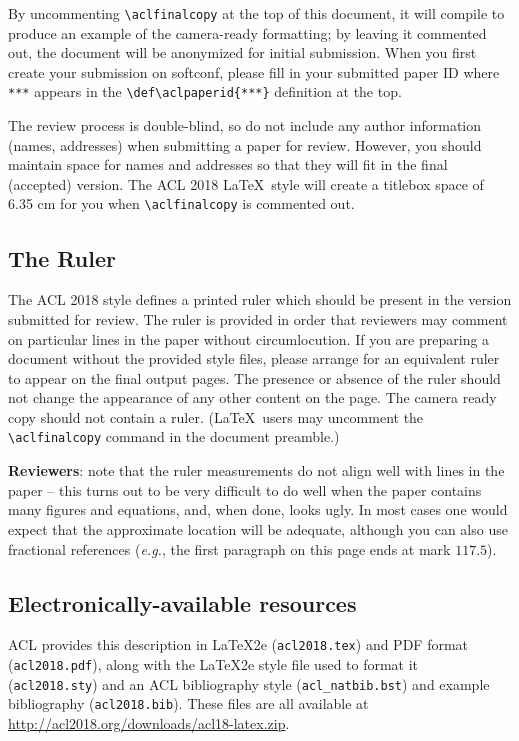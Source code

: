 \documentclass[11pt,a4paper]{article}
\begin{document}
By uncommenting {\verb|\aclfinalcopy|} at the top of this 
 document, it will compile to produce an example of the camera-ready formatting; by leaving it commented out, the document will be anonymized for initial submission.  When you first create your submission on softconf, please fill in your submitted paper ID where {\verb|***|} appears in the {\verb|\def\aclpaperid{***}|} definition at the top.

The review process is double-blind, so do not include any author information (names, addresses) when submitting a paper for review.  
However, you should maintain space for names and addresses so that they will fit in the final (accepted) version.  The ACL 2018 \LaTeX\ style will create a titlebox space of 6.35 cm for you when {\verb|\aclfinalcopy|} is commented out.  

\subsection{The Ruler}
The ACL 2018 style defines a printed ruler which should be present in the
version submitted for review.  The ruler is provided in order that
reviewers may comment on particular lines in the paper without
circumlocution.  If you are preparing a document without the provided
style files, please arrange for an equivalent ruler to
appear on the final output pages.  The presence or absence of the ruler
should not change the appearance of any other content on the page.  The
camera ready copy should not contain a ruler. (\LaTeX\ users may uncomment the {\verb|\aclfinalcopy|} command in the document preamble.)  

\textbf{Reviewers}: note that the ruler measurements do not align well with
lines in the paper -- this turns out to be very difficult to do well
when the paper contains many figures and equations, and, when done,
looks ugly. In most cases one would expect that the approximate
location will be adequate, although you can also use fractional
references ({\em e.g.}, the first paragraph on this page ends at mark $117.5$).

\subsection{Electronically-available resources}

ACL provides this description in \LaTeX2e{} ({\small\tt acl2018.tex}) and PDF
format ({\small\tt acl2018.pdf}), along with the \LaTeX2e{} style file used to
format it ({\small\tt acl2018.sty}) and an ACL bibliography style ({\small\tt acl\_natbib.bst})
and example bibliography ({\small\tt acl2018.bib}).
These files are all available at
\url{http://acl2018.org/downloads/acl18-latex.zip}.
\end{document}
